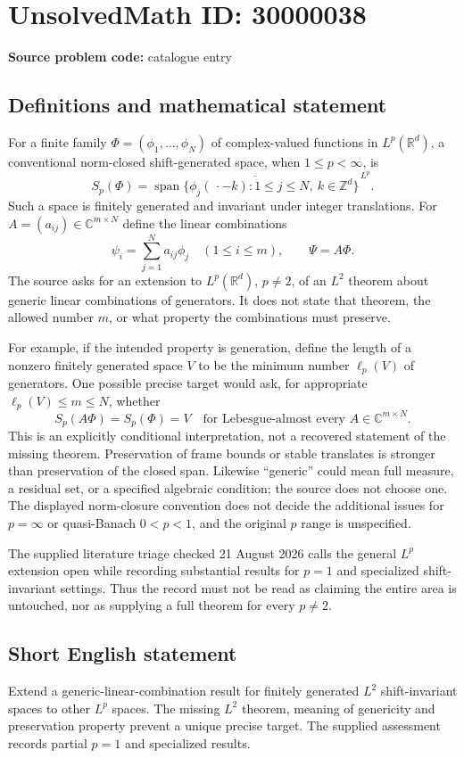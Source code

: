 \documentclass[11pt]{article}
\newcommand{\Z}{\mathbb{Z}}
\newcommand{\R}{\mathbb{R}}
\newcommand{\C}{\mathbb{C}}
\begin{document}
\section*{UnsolvedMath ID: 30000038}
\textbf{Source problem code:} catalogue entry
\subsection{Definitions and mathematical statement}
For a finite family $\Phi=(\phi_1,\ldots,\phi_N)$ of complex-valued functions in $L^p(\R^d)$, a conventional norm-closed shift-generated space, when $1\leq p<\infty$, is
\[
 S_p(\Phi)=\overline{\operatorname{span}\{\phi_j(\,\cdot-k):
                 1\leq j\leq N,\ k\in\Z^d\}}^{\,L^p}.
\]
Such a space is finitely generated and invariant under integer translations. For $A=(a_{ij})\in\C^{m\times N}$ define the linear combinations
\[
 \psi_i=\sum_{j=1}^N a_{ij}\phi_j\quad(1\leq i\leq m),
 \qquad \Psi=A\Phi.
\]
The source asks for an extension to $L^p(\R^d)$, $p\ne2$, of an $L^2$ theorem about generic linear combinations of generators. It does not state that theorem, the allowed number $m$, or what property the combinations must preserve.

For example, if the intended property is generation, define the length of a nonzero finitely generated space $V$ to be the minimum number $\ell_p(V)$ of generators. One possible precise target would ask, for appropriate $\ell_p(V)\leq m\leq N$, whether
\[
 S_p(A\Phi)=S_p(\Phi)=V
 \quad\text{for Lebesgue-almost every }A\in\C^{m\times N}.
\]
This is an explicitly conditional interpretation, not a recovered statement of the missing theorem. Preservation of frame bounds or stable translates is stronger than preservation of the closed span. Likewise ``generic'' could mean full measure, a residual set, or a specified algebraic condition; the source does not choose one. The displayed norm-closure convention does not decide the additional issues for $p=\infty$ or quasi-Banach $0<p<1$, and the original $p$ range is unspecified.

The supplied literature triage checked 21 August 2026 calls the general $L^p$ extension open while recording substantial results for $p=1$ and specialized shift-invariant settings. Thus the record must not be read as claiming the entire area is untouched, nor as supplying a full theorem for every $p\ne2$.
\subsection{Short English statement}
Extend a generic-linear-combination result for finitely generated $L^2$ shift-invariant spaces to other $L^p$ spaces. The missing $L^2$ theorem, meaning of genericity and preservation property prevent a unique precise target. The supplied assessment records partial $p=1$ and specialized results.
\end{document}
